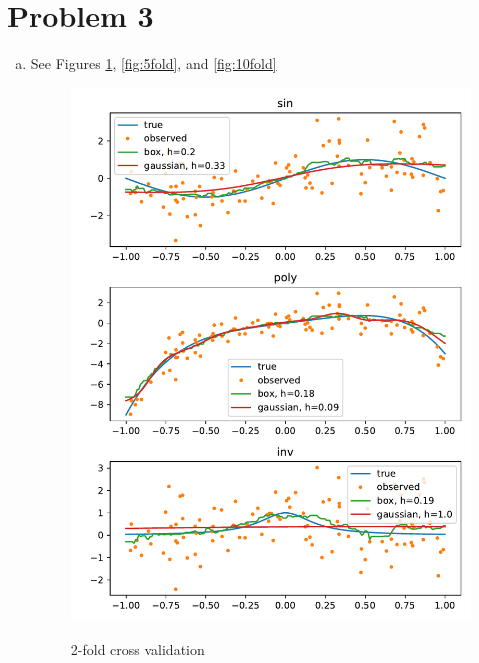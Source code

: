 \documentclass[letterpaper]{article}
\begin{document}
\section*{Problem 3}
\begin{enumerate}[(a)]
\item See Figures \ref{fig:2fold}, \ref{fig:5fold}, and \ref{fig:10fold}
  \begin{figure}
    \caption{2-fold cross validation}
    \includegraphics{cv_kernel_regression_2.pdf}
    \label{fig:2fold}
  \end{figure}


\end{enumerate}
\end{document}
